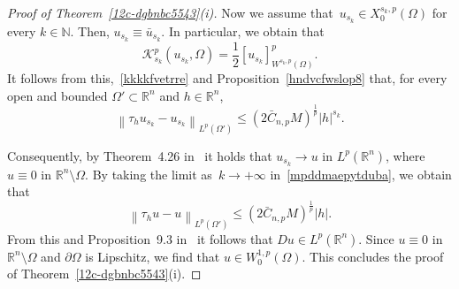 \documentclass[12pt]{article}
\newcommand{\R}{\mathbb{R}}
\newcommand{\N}{\mathbb{N}}
\numberwithin{equation}{section}
\renewcommand{\leq}{\leqslant}
\begin{document}
\begin{proof}[Proof of Theorem~\ref{12c-dgbnbc5543}(i)]
Now we assume that~$u_{s_k}\in X_0^{s_k,p}(\Omega)$ for every $k\in\N$. Then, $u_{s_k}\equiv \bar{u}_{s_k}$. In particular, we obtain that 
\begin{equation*}
\mathcal{K}_{s_k}^p(u_{s_k},\Omega)=\frac{1}{2}\left[u_{s_k}\right]_{W^{s_k,p}(\Omega)}^p. 
\end{equation*}
It follows from this,~\eqref{kkkkfvetrre} and Proposition~\ref{hndvcfwslop8} that, for every open and bounded $\Omega'\subset\R^n$ and $h\in\R^n$, 
\begin{equation}\label{mpddmaepytduba}
\left\| \tau_h u_{s_k}-u_{s_k}  \right\|_{L^p(\Omega')} \leq \left(2\bar{C}_{n,p}M\right)^\frac{1}{p}\left|h\right|^{s_k}. 
\end{equation}

Consequently, by Theorem~4.26 in~\cite{MR2759829} it holds that $u_{s_k}\to u$ in $L^p(\R^n)$, where $u\equiv 0$ in $\R^n\setminus \Omega$. By taking the limit as~$k\to +\infty$ in~\eqref{mpddmaepytduba}, we obtain  that
\begin{equation*}
\left\| \tau_h u-u \right\|_{L^p(\Omega')}\leq \left(2\bar{C}_{n,p}M\right)^\frac{1}{p} \left|h\right|. 
\end{equation*}  
From this and Proposition~9.3 in~\cite{MR2759829} it follows that $Du\in L^p(\R^n)$. Since $u\equiv 0$ in $\R^n\setminus \Omega$ and $\partial \Omega$ is Lipschitz, we find that $u\in W_0^{1,p}(\Omega)$. This concludes the proof of Theorem~\ref{12c-dgbnbc5543}(i).
\end{proof}
\end{document}
